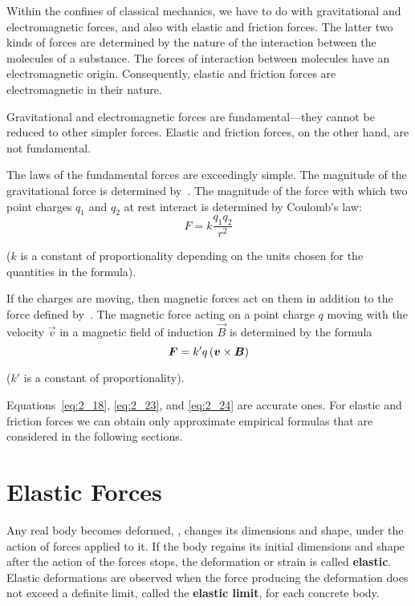 Within the confines of classical mechanics, we have to do with gravitational and electromagnetic forces, and also with elastic and friction forces. The latter two kinds of forces are determined by the nature of the interaction between the molecules of a substance. The forces of interaction between molecules have an electromagnetic origin. Consequently, elastic and friction forces are electromagnetic in their nature.

Gravitational and electromagnetic forces are fundamental---they cannot be reduced to other simpler forces. Elastic and friction forces, on the other hand, are not fundamental.

The laws of the fundamental forces are exceedingly simple. The magnitude of the gravitational force is determined by~. The magnitude of the force with which two point charges $q_1$ and $q_2$ at rest interact is determined by Coulomb's law:
\vspace{-12pt}
\begin{equation}\label{eq:2_23}
F = k\frac{q_1q_2}{r^2}
\end{equation}

\noindent
($k$ is a constant of proportionality depending on the units chosen for the quantities in the formula). 

If the charges are moving, then magnetic forces act on them in addition to the force defined by~. The magnetic force acting on a point charge $q$ moving with the velocity $\vec{v}$ in a magnetic field of induction $\vec{B}$ is determined by the formula
\begin{equation}\label{eq:2_24}
\boldsymbol{F} = k'q\,(\boldsymbol{v}\times\boldsymbol{B})
\end{equation}

\noindent
($k'$ is a constant of proportionality).

Equations~\eqref{eq:2_18}, \eqref{eq:2_23}, and \eqref{eq:2_24} are accurate ones. For elastic and friction forces we can obtain only approximate empirical formulas that are considered in the following sections.

\section{Elastic Forces}\label{sec:2_9}

Any real body becomes deformed, \ie, changes its dimensions and shape, under the action of forces applied to it. If the body regains its initial dimensions and shape after the action of the forces stops, the deformation or strain is called \textbf{elastic}. Elastic deformations are observed when the force producing the deformation does not exceed a definite limit, called the \textbf{elastic limit}, for each concrete body.

